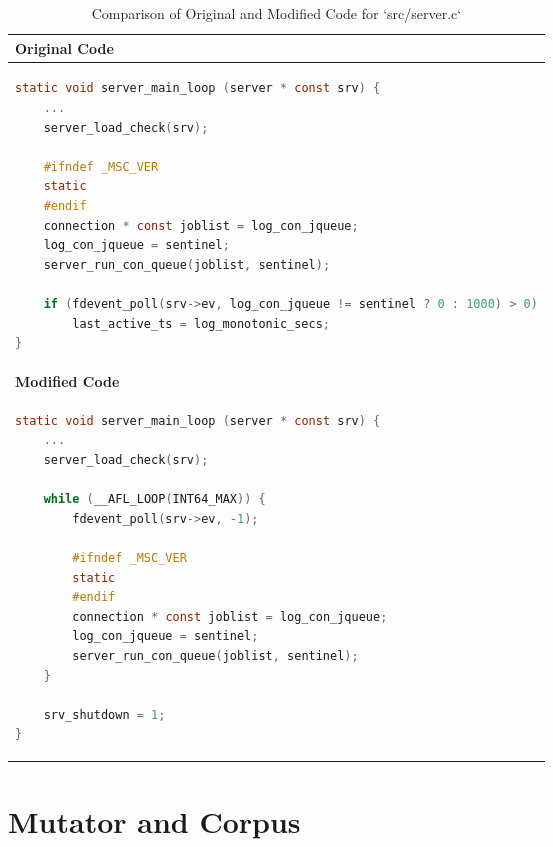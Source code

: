 \begin{table}[H]
\centering
\begin{tabular}{|p{}|}
\hline
\textbf{Original Code} \\
\hline
\begin{lstlisting}[language=c, basicstyle=\footnotesize, breaklines=true]
static void server_main_loop (server * const srv) {
    ...
    server_load_check(srv);

    #ifndef _MSC_VER
    static
    #endif
    connection * const joblist = log_con_jqueue;
    log_con_jqueue = sentinel;
    server_run_con_queue(joblist, sentinel);

    if (fdevent_poll(srv->ev, log_con_jqueue != sentinel ? 0 : 1000) > 0)
        last_active_ts = log_monotonic_secs;
}
\end{lstlisting} \\
\hline
\textbf{Modified Code} \\
\hline
\begin{lstlisting}[language=c, basicstyle=\footnotesize, breaklines=true]
static void server_main_loop (server * const srv) {
    ...
    server_load_check(srv);

    while (__AFL_LOOP(INT64_MAX)) {
        fdevent_poll(srv->ev, -1);
        
        #ifndef _MSC_VER
        static
        #endif
        connection * const joblist = log_con_jqueue;
        log_con_jqueue = sentinel;
        server_run_con_queue(joblist, sentinel);
    }

    srv_shutdown = 1;
}
\end{lstlisting} \\
\hline
\end{tabular}
\caption{Comparison of Original and Modified Code for `src/server.c`}
\label{tab:server_patch}
\end{table}

\section{Mutator and Corpus}

